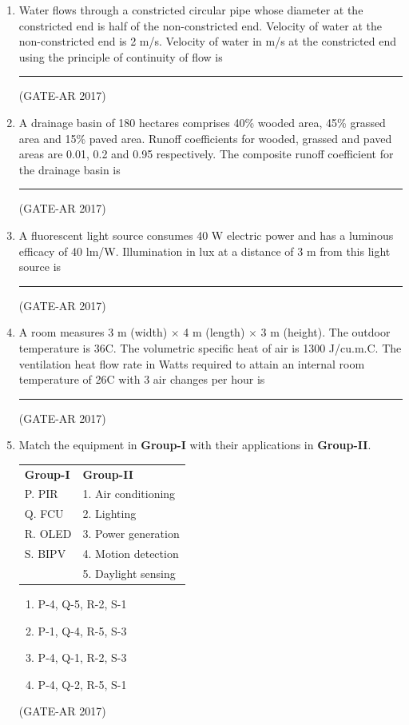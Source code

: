 \documentclass[a4paper,10pt]{article}
\begin{document}
\begin{enumerate}
    \item Water flows through a constricted circular pipe whose diameter at the constricted end is half of the non-constricted end. Velocity of water at the non-constricted end is 2 m/s. Velocity of water in m/s at the constricted end using the principle of continuity of flow is \rule{2cm}{0.4pt}
    \hfill (GATE-AR 2017)

    \item A drainage basin of 180 hectares comprises 40\% wooded area, 45\% grassed area and 15\% paved area. Runoff coefficients for wooded, grassed and paved areas are 0.01, 0.2 and 0.95 respectively. The composite runoff coefficient for the drainage basin is \rule{2cm}{0.4pt}
    \hfill (GATE-AR 2017)

    \item A fluorescent light source consumes 40 W electric power and has a luminous efficacy of 40 lm/W. Illumination in lux at a distance of 3 m from this light source is \rule{2cm}{0.4pt}
    \hfill (GATE-AR 2017)

    \item A room measures 3 m (width) $\times$ 4 m (length) $\times$ 3 m (height). The outdoor temperature is 36\textdegree C. The volumetric specific heat of air is 1300 J/cu.m.\textdegree C. The ventilation heat flow rate in Watts required to attain an internal room temperature of 26\textdegree C with 3 air changes per hour is \rule{2cm}{0.4pt}
    \hfill (GATE-AR 2017)

    \item Match the equipment in \textbf{Group-I} with their applications in \textbf{Group-II}. \\
    \begin{tabular}{ l l }
	\textbf{Group-I} & \textbf{Group-II} \\
	P. PIR & 1. Air conditioning \\
	Q. FCU & 2. Lighting \\
	R. OLED & 3. Power generation \\
	S. BIPV & 4. Motion detection \\
	& 5. Daylight sensing \\
	\end{tabular}
	\begin{multicols}{2}
	\begin{enumerate}
        \item P-4, Q-5, R-2, S-1
        \item P-1, Q-4, R-5, S-3
        \item P-4, Q-1, R-2, S-3
        \item P-4, Q-2, R-5, S-1
    \end{enumerate}
	\end{multicols}
    \hfill (GATE-AR 2017)


\end{enumerate}
\end{document}
